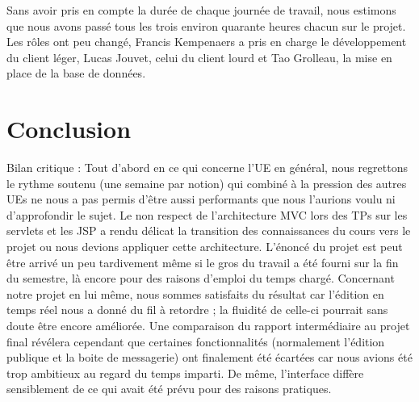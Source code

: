 \documentclass[a4paper, 12pt]{article}
\begin{document}
Sans avoir pris en compte la durée de chaque journée de travail, nous estimons que nous avons passé tous les trois environ quarante heures chacun sur le projet.
Les rôles ont peu changé, Francis Kempenaers a pris en charge le développement du client léger, Lucas Jouvet, celui du client lourd et Tao Grolleau, la mise en place de la base de données. 

\section{Conclusion}

Bilan critique : Tout d'abord en ce qui concerne l'UE en général, nous regrettons le rythme soutenu (une semaine par notion) qui combiné à la pression des autres UEs ne nous a pas permis d'être aussi performants que nous l'aurions voulu ni d'approfondir le sujet. Le non respect de l'architecture MVC lors des TPs sur les servlets et les JSP a rendu délicat la transition des connaissances du cours vers le projet ou nous devions appliquer cette architecture. L'énoncé du projet est peut être arrivé un peu tardivement même si le gros du travail a été fourni sur la fin du semestre, là encore pour des raisons d'emploi du temps chargé.
Concernant notre projet en lui même, nous sommes satisfaits du résultat car l'édition en temps réel nous a donné du fil à retordre ; la fluidité de celle-ci pourrait sans doute être encore améliorée. Une comparaison du rapport intermédiaire au projet final révélera cependant que certaines fonctionnalités (normalement l'édition publique et la boite de messagerie) ont finalement été écartées car nous avions été trop ambitieux au regard du temps imparti. De même, l'interface diffère sensiblement de ce qui avait été prévu pour des raisons pratiques.
\end{document}

